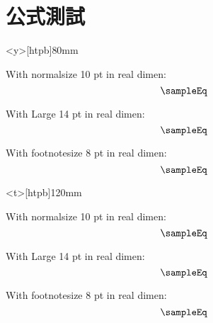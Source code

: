 \chapter{公式測試}

\begin{minipage}<y>[htpb]{80mm}
		\vspace*{55mm}
			{\normalsize With normalsize 10 pt in real dimen:
				\[ \sampleEq \]\par}

			{\Large With Large 14 pt in real dimen:
				\[ \sampleEq \]\par}

			{\footnotesize With footnotesize 8 pt in real dimen:
				\[ \sampleEq \]\par}
\end{minipage}

\clearpage
\begin{minipage}<t>[htpb]{120mm}
		\vspace*{10mm}
			{\normalsize With normalsize 10 pt in real dimen:
				\[ \sampleEq \]\par}

			{\Large With Large 14 pt in real dimen:
				\[ \sampleEq \]\par}

			{\footnotesize With footnotesize 8 pt in real dimen:
				\[ \sampleEq \]\par}
\end{minipage}



\endinput